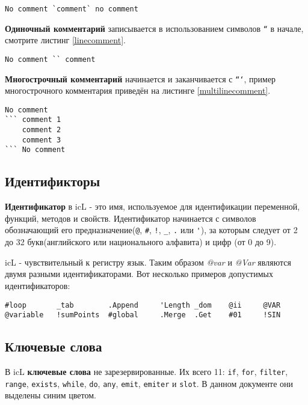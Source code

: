 \documentclass[a4paper, 14pt]{extarticle}
\begin{document}
\begin{lstlisting}[caption=Комментарий в линии,label=inlinecomment]
No comment `comment` no comment
\end{lstlisting}
	
	\textbf{Одиночный комментарий} записывается в использованием символов \texttt{``} в начале, смотрите листинг \ref{linecomment}.
	
\begin{lstlisting}[caption=Одиночный комментарий,label=linecomment]
No comment `` comment
\end{lstlisting}
	
	\textbf{Многострочный комментарий} начинается и заканчивается с \texttt{```}, пример многострочного комментария приведён на листинге \ref{multilinecomment}.
	
\begin{lstlisting}[caption=Многострочный комментарий,label=multilinecomment]
No comment
``` comment 1
	comment 2
	comment 3
``` No comment
\end{lstlisting}
	
\subsection{Идентификторы}
	
	\textbf{Идентификатор} в icL - это имя, используемое для идентификации переменной, функций, методов и свойств. Идентификатор начинается с символов обозначающий его предназначение(\lstinline`@`, \lstinline`#`, \lstinline`!`, \lstinline`_`, \lstinline`.` или \lstinline`'`), за которым следует от 2 до 32 букв(английского или национального алфавита) и цифр (от 0 до 9).
	
	icL - чувствительный к регистру язык. Таким образом \textit{@var} и \textit{@Var} являются двумя разными идентификаторами. Вот несколько примеров допустимых идентификаторов:
	
\begin{lstlisting}[numbers=none]
#loop		_tab		.Append		'Length	_dom	@ii 	@VAR
@variable	!sumPoints	#global		.Merge	.Get	#01		!SIN
\end{lstlisting}
	
\subsection{Ключевые слова}
	
	В icL \textbf{ключевые слова} не зарезервированные. Их всего 11: \lstinline`if`, \lstinline`for`, \lstinline`filter`, \lstinline`range`, \lstinline`exists`, \lstinline`while`, \lstinline`do`, \lstinline`any`, \lstinline`emit`, \lstinline`emiter` и \lstinline`slot`. В данном документе они выделены синим цветом.
  
\end{document}

